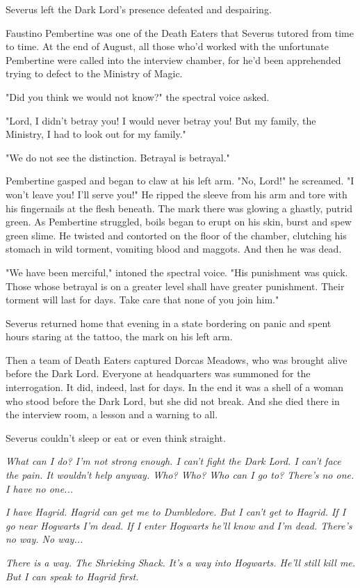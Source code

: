 Severus left the Dark Lord's presence defeated and despairing.

Faustino Pembertine was one of the Death Eaters that Severus tutored from time to time. At the end of August, all those who'd worked with the unfortunate Pembertine were called into the interview chamber, for he'd been apprehended trying to defect to the Ministry of Magic.

"Did you think we would not know?" the spectral voice asked.

"Lord, I didn't betray you! I would never betray you! But my family, the Ministry, I had to look out for my family."

"We do not see the distinction. Betrayal is betrayal."

Pembertine gasped and began to claw at his left arm. "No, Lord!" he screamed. "I won't leave you! I'll serve you!" He ripped the sleeve from his arm and tore with his fingernails at the flesh beneath. The mark there was glowing a ghastly, putrid green. As Pembertine struggled, boils began to erupt on his skin, burst and spew green slime. He twisted and contorted on the floor of the chamber, clutching his stomach in wild torment, vomiting blood and maggots. And then he was dead.

"We have been merciful," intoned the spectral voice. "His punishment was quick. Those whose betrayal is on a greater level shall have greater punishment. Their torment will last for days. Take care that none of you join him."

Severus returned home that evening in a state bordering on panic and spent hours staring at the tattoo, the mark on his left arm.

Then a team of Death Eaters captured Dorcas Meadows, who was brought alive before the Dark Lord. Everyone at headquarters was summoned for the interrogation. It did, indeed, last for days. In the end it was a shell of a woman who stood before the Dark Lord, but she did not break. And she died there in the interview room, a lesson and a warning to all.

Severus couldn't sleep or eat or even think straight.

\emph{What can I do? I'm not strong enough. I can't fight the Dark Lord. I can't face the pain. It wouldn't help anyway. Who? Who? Who can I go to? There's no one. I have no one...}

\emph{I have Hagrid. Hagrid can get me to Dumbledore. But I can't get to Hagrid. If I go near Hogwarts I'm dead. If I enter Hogwarts he'll know and I'm dead. There's no way. No way...}

\emph{There is a way. The Shrieking Shack. It's a way into Hogwarts. He'll still kill me. But I can speak to Hagrid first.} 


